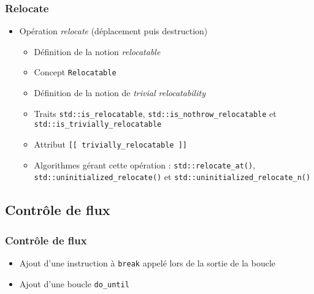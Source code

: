 \documentclass[C++.tex]{subfiles}
\begin{document}
\begin{frame}[fragile]
	\frametitle{Relocate}
	\begin{itemize}
		\item Opération \textit{relocate} (déplacement puis destruction)


		\begin{itemize}
			\item Définition de la notion \textit{relocatable}
			\item Concept \lstinline|Relocatable|


			\item Définition de la notion de \textit{trivial relocatability}


			\item Traits \lstinline|std::is_relocatable|, \lstinline|std::is_nothrow_relocatable| et \lstinline|std::is_trivially_relocatable|
			\item Attribut \lstinline|[[ trivially_relocatable ]]|
			\item Algorithmes gérant cette opération : \lstinline|std::relocate_at()|, \lstinline|std::uninitialized_relocate()| et \lstinline|std::uninitialized_relocate_n()|
		\end{itemize}
	\end{itemize}
\end{frame}

\subsection*{Contrôle de flux}
\begin{frame}[fragile]
	\frametitle{Contrôle de flux}
	\begin{itemize}
		\item Ajout d'une instruction à \lstinline|break| appelé lors de la sortie de la boucle


		\item Ajout d'une boucle \lstinline|do_until|
	\end{itemize}
\end{frame}
\end{document}
